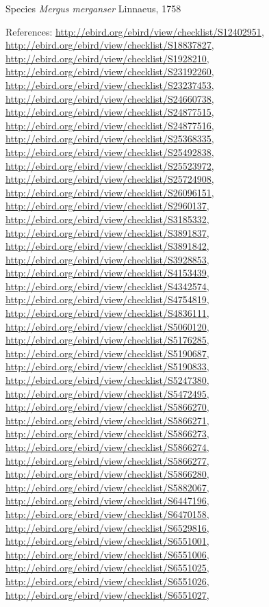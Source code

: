 \documentclass[9pt, article]{memoir}
\begin{document}
\begin{multicols}{2}
\vspace{6pt}\noindent\hspace{36pt}Species \textit{Mergus merganser} Linnaeus, 1758


\vspace{6pt}References: 
\url{http://ebird.org/ebird/view/checklist/S12402951}, 
\url{http://ebird.org/ebird/view/checklist/S18837827}, 
\url{http://ebird.org/ebird/view/checklist/S1928210}, 
\url{http://ebird.org/ebird/view/checklist/S23192260}, 
\url{http://ebird.org/ebird/view/checklist/S23237453}, 
\url{http://ebird.org/ebird/view/checklist/S24660738}, 
\url{http://ebird.org/ebird/view/checklist/S24877515}, 
\url{http://ebird.org/ebird/view/checklist/S24877516}, 
\url{http://ebird.org/ebird/view/checklist/S25368335}, 
\url{http://ebird.org/ebird/view/checklist/S25492838}, 
\url{http://ebird.org/ebird/view/checklist/S25523972}, 
\url{http://ebird.org/ebird/view/checklist/S25724908}, 
\url{http://ebird.org/ebird/view/checklist/S26096151}, 
\url{http://ebird.org/ebird/view/checklist/S2960137}, 
\url{http://ebird.org/ebird/view/checklist/S3185332}, 
\url{http://ebird.org/ebird/view/checklist/S3891837}, 
\url{http://ebird.org/ebird/view/checklist/S3891842}, 
\url{http://ebird.org/ebird/view/checklist/S3928853}, 
\url{http://ebird.org/ebird/view/checklist/S4153439}, 
\url{http://ebird.org/ebird/view/checklist/S4342574}, 
\url{http://ebird.org/ebird/view/checklist/S4754819}, 
\url{http://ebird.org/ebird/view/checklist/S4836111}, 
\url{http://ebird.org/ebird/view/checklist/S5060120}, 
\url{http://ebird.org/ebird/view/checklist/S5176285}, 
\url{http://ebird.org/ebird/view/checklist/S5190687}, 
\url{http://ebird.org/ebird/view/checklist/S5190833}, 
\url{http://ebird.org/ebird/view/checklist/S5247380}, 
\url{http://ebird.org/ebird/view/checklist/S5472495}, 
\url{http://ebird.org/ebird/view/checklist/S5866270}, 
\url{http://ebird.org/ebird/view/checklist/S5866271}, 
\url{http://ebird.org/ebird/view/checklist/S5866273}, 
\url{http://ebird.org/ebird/view/checklist/S5866274}, 
\url{http://ebird.org/ebird/view/checklist/S5866277}, 
\url{http://ebird.org/ebird/view/checklist/S5866280}, 
\url{http://ebird.org/ebird/view/checklist/S5882067}, 
\url{http://ebird.org/ebird/view/checklist/S6447196}, 
\url{http://ebird.org/ebird/view/checklist/S6470158}, 
\url{http://ebird.org/ebird/view/checklist/S6529816}, 
\url{http://ebird.org/ebird/view/checklist/S6551001}, 
\url{http://ebird.org/ebird/view/checklist/S6551006}, 
\url{http://ebird.org/ebird/view/checklist/S6551025}, 
\url{http://ebird.org/ebird/view/checklist/S6551026}, 
\url{http://ebird.org/ebird/view/checklist/S6551027}, 

\end{multicols}
\end{document}

